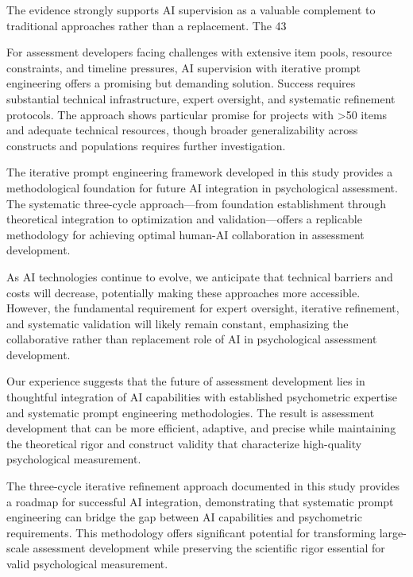 \documentclass[12pt,a4paper]{article}
\begin{document}
The evidence strongly supports AI supervision as a valuable complement to traditional approaches rather than a replacement. The 43%

For assessment developers facing challenges with extensive item pools, resource constraints, and timeline pressures, AI supervision with iterative prompt engineering offers a promising but demanding solution. Success requires substantial technical infrastructure, expert oversight, and systematic refinement protocols. The approach shows particular promise for projects with >50 items and adequate technical resources, though broader generalizability across constructs and populations requires further investigation.

The iterative prompt engineering framework developed in this study provides a methodological foundation for future AI integration in psychological assessment. The systematic three-cycle approach—from foundation establishment through theoretical integration to optimization and validation—offers a replicable methodology for achieving optimal human-AI collaboration in assessment development.

As AI technologies continue to evolve, we anticipate that technical barriers and costs will decrease, potentially making these approaches more accessible. However, the fundamental requirement for expert oversight, iterative refinement, and systematic validation will likely remain constant, emphasizing the collaborative rather than replacement role of AI in psychological assessment development.

Our experience suggests that the future of assessment development lies in thoughtful integration of AI capabilities with established psychometric expertise and systematic prompt engineering methodologies. The result is assessment development that can be more efficient, adaptive, and precise while maintaining the theoretical rigor and construct validity that characterize high-quality psychological measurement.

The three-cycle iterative refinement approach documented in this study provides a roadmap for successful AI integration, demonstrating that systematic prompt engineering can bridge the gap between AI capabilities and psychometric requirements. This methodology offers significant potential for transforming large-scale assessment development while preserving the scientific rigor essential for valid psychological measurement.
\end{document}
